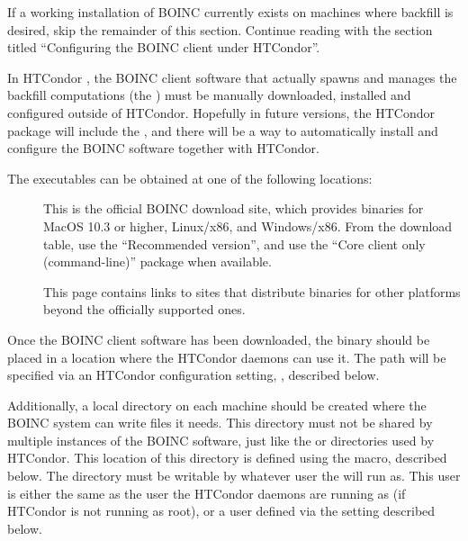 
If a working installation of BOINC currently exists on machines
where backfill is desired,
skip the remainder of this section.
Continue reading with the section titled ``Configuring the BOINC
client under HTCondor''.

In HTCondor \VersionNotice, the BOINC client software that actually
spawns and manages the backfill computations (the
) must be manually downloaded, installed and
configured outside of HTCondor.
Hopefully in future versions, the HTCondor package will include the
, and there will be a way to automatically install
and configure the BOINC software together with HTCondor.

The  executables can be obtained at one of the
following locations:
\begin{description}
\item[]
  This is the official BOINC download site, which provides binaries
  for MacOS 10.3 or higher, Linux/x86, and Windows/x86.
  From the download table, use the ``Recommended version'', and use 
  the ``Core client only (command-line)'' package when available.

\item[]
  This page contains links to sites that distribute
   binaries for other platforms beyond the
  officially supported ones.
\end{description}

Once the BOINC client software has been downloaded, the
 binary should be placed in a location where the
HTCondor daemons can use it.
The path will be specified via an HTCondor configuration setting,
, described below.

Additionally, a local directory on each machine should be created
where the BOINC system can write files it needs.
This directory must not be shared by multiple instances of the BOINC
software, just like the  or  directories
used by HTCondor.
This location of this directory is defined using the
 macro, described below.
The directory must be writable by whatever user the
 will run as.
This user is either the same as the user the HTCondor daemons are
running as (if HTCondor is not running as root), or a user defined via
the  setting described below.

